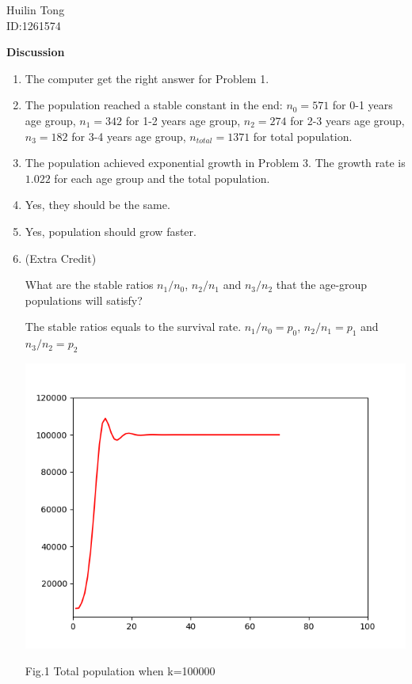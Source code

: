 \documentclass{article}
\begin{document}
\begin{center} Huilin Tong\\
ID:1261574
\end{center}

{\bf Discussion}\\

\begin{enumerate}

\item The computer get the right answer for Problem 1.
\item The population reached a stable constant in the end: $n_0= 571$ for 0-1 years age group, $n_1= 342$ for 1-2 years age group, $n_2= 274$ for 2-3 years age group, $n_3= 182$ for 3-4 years age group, $n_{total}=1371$ for total population.

\item The population achieved exponential growth in Problem 3.
The growth rate is $1.022$ for each age group and the total population.
\item Yes, they should be the same.
\item Yes, population should grow faster.
\item (Extra Credit)

What are the stable ratios $n_1/n_0$, $n_2/n_1$ and $n_3/n_2$ that the age-group populations will satisfy? 

The stable ratios equals to the survival rate. $n_1/n_0=p_0$, $n_2/n_1=p_1$ and $n_3/n_2=p_2$
\begin{center}
\includegraphics[scale=0.7]{graph3.png}

Fig.1 Total population when k=100000
\end{center}


\end{enumerate}
\end{document}
